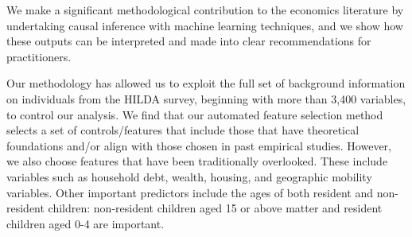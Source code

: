 \documentclass[12pt, a4paper]{article}
\begin{document}
We make a significant methodological contribution to the economics literature by undertaking causal inference with machine learning techniques, and we show how these outputs can be interpreted and made into clear recommendations for practitioners.  

Our methodology has allowed us to exploit the full set of background
information on individuals from the HILDA survey, beginning with more than
3,400 variables, to control our analysis. 
We find that our automated feature selection method selects a set of
controls/features that include those that have theoretical foundations and/or
align with those chosen in past empirical studies. However, we also choose
features that have been traditionally overlooked. These include variables such
as household debt, wealth, housing, and geographic mobility variables. Other
important predictors include the ages of both resident and non-resident
children: non-resident children aged 15 or above matter and resident children
aged 0-4 are important.



\end{document}
